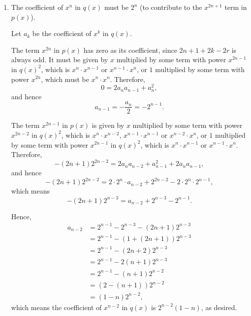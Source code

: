 \begin{enumerate}
    \item The coefficient of \(x^n\) in \(q(x)\) must be \(2^{n}\) (to contribute to the \(x^{2n + 1}\) term in \(p(x)\)).

          Let \(a_k\) be the coefficient of \(x^k\) in \(q(x)\).

          The term \(x^{2n}\) in \(p(x)\) has zero as its coefficient, since \(2n + 1 + 2k - 2r\) is always odd. It must be given by \(x\) multiplied by some term with power \(x^{2n - 1}\) in \(q(x)^2\), which is \(x^{n} \cdot x^{n - 1}\) or \(x^{n - 1} \cdot x^{n}\), or \(1\) multiplied by some term with power \(x^{2n}\), which must be \(x^n \cdot x^n\). Therefore,
          \[
              0 = 2 a_n a_{n - 1} + a_n^2,
          \]
          and hence
          \[
              a_{n - 1} = - \frac{a_n}{2} = - 2^{n - 1}.
          \]

          The term \(x^{2n - 1}\) in \(p(x)\) is given by \(x\) multiplied by some term with power \(x^{2n - 2}\) in \(q(x)^2\), which is \(x^{n} \cdot x^{n - 2}\), \(x^{n - 1} \cdot x^{n - 1}\) or \(x^{n - 2} \cdot x^{n}\), or \(1\) multiplied by some term with power \(x^{2n - 1}\) in \(q(x)^2\), which is \(x^{n} \cdot x^{n - 1}\) or \(x^{n - 1} \cdot x^{n}\). Therefore,
          \[
              - (2n + 1) 2^{2n - 2} = 2 a_{n} a_{n - 2} + a_{n - 1}^2 + 2 a_{n} a_{n - 1},
          \]
          and hence
          \[
              - (2n + 1) 2^{2n - 2} = 2 \cdot 2^n \cdot a_{n - 2} + 2^{2n - 2} - 2 \cdot 2^{n} \cdot 2^{n - 1},
          \]
          which means
          \[
              - (2n + 1) 2^{n - 3} = a_{n - 2} + 2^{n - 3} - 2^{n - 1}.
          \]

          Hence,
          \begin{align*}
              a_{n - 2} & = 2^{n - 1} - 2^{n - 3} - (2n + 1) 2^{n - 3} \\
                        & = 2^{n - 1} - (1 + (2n + 1)) 2^{n - 3}       \\
                        & = 2^{n - 1} - (2n + 2) 2^{n - 3}             \\
                        & = 2^{n - 1} - 2 (n + 1) 2^{n - 3}            \\
                        & = 2^{n - 1} - (n + 1) 2^{n - 2}              \\
                        & = (2 - (n + 1)) 2^{n - 2}                    \\
                        & = (1 - n) 2^{n - 2},
          \end{align*}
          which means the coefficient of \(x^{n - 2}\) in \(q(x)\) is \(2^{n - 2} (1 - n)\), as desired.
\end{enumerate}